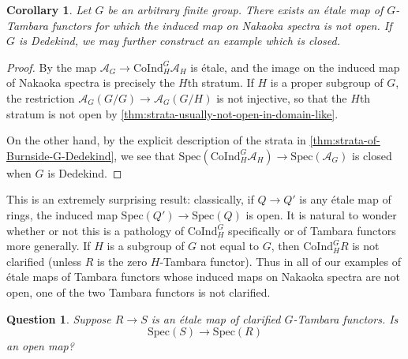 \documentclass[11pt,dvipsnames]{amsart}
\newcommand{\A}{\mathcal{A}}
\newtheorem{corollary}[theorem]{Corollary}
\theoremstyle{BoldRemark}
\newtheorem{question}[theorem]{Question}
\newcommand{\Spec}{\mathrm{Spec}}
\newcommand{\Coind}{\mathrm{CoInd}}
\begin{document}
\begin{corollary}\label{cor:ex-of-etale-map-which-is-not-open}
    Let $G$ be an arbitrary finite group. There exists an \'{e}tale map of $G$-Tambara functors for which the induced map on Nakaoka spectra is not open. If $G$ is Dedekind, we may further construct an example which is closed.
\end{corollary}

\begin{proof}
    By \cite[Theorem A]{Wis25c} the map $\A_G \rightarrow \Coind_H^G \A_H$ is \'{e}tale, and the image on the induced map of Nakaoka spectra is precisely the $H$th stratum. If $H$ is a proper subgroup of $G$, the restriction $\A_G(G/G) \rightarrow \A_G(G/H)$ is not injective, so that the $H$th stratum is not open by \cref{thm:strata-usually-not-open-in-domain-like}.

    On the other hand, by the explicit description of the strata in \cref{thm:strata-of-Burnside-G-Dedekind}, we see that $\Spec(\Coind_H^G \A_H) \rightarrow \Spec(\A_G)$ is closed when $G$ is Dedekind.
\end{proof}

This is an extremely surprising result: classically, if $Q \rightarrow Q'$ is any \'{e}tale map of rings, the induced map $\Spec(Q') \rightarrow \Spec(Q)$ is open. It is natural to wonder whether or not this is a pathology of $\Coind_H^G$ specifically or of Tambara functors more generally. If $H$ is a subgroup of $G$ not equal to $G$, then $\Coind_H^G R$ is not clarified (unless $R$ is the zero $H$-Tambara functor). Thus in all of our examples of \'{e}tale maps of Tambara functors whose induced maps on Nakaoka spectra are not open, one of the two Tambara functors is not clarified.

\begin{question}
    Suppose $R \rightarrow S$ is an \'{e}tale map of clarified $G$-Tambara functors. Is 
    \[ 
        \Spec(S) \rightarrow \Spec(R) 
    \] 
    an open map?
\end{question}
\end{document}

